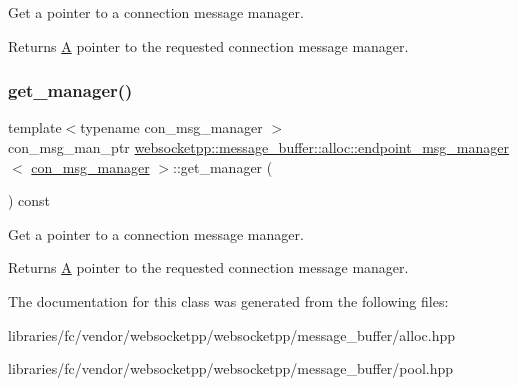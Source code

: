 Get a pointer to a connection message manager. 

\begin{DoxyReturn}{Returns}
\mbox{\hyperlink{struct_a}{A}} pointer to the requested connection message manager. 
\end{DoxyReturn}
\mbox{\label{classwebsocketpp_1_1message__buffer_1_1alloc_1_1endpoint__msg__manager_a58c3cece7c5122cfabb4f0071cd9ced4}} 
\subsubsection{\texorpdfstring{get\+\_\+manager()}{get\_manager()}\hspace{0.1cm}{\footnotesize\ttfamily [2/2]}}
{\footnotesize\ttfamily template$<$typename con\+\_\+msg\+\_\+manager $>$ \\
con\+\_\+msg\+\_\+man\+\_\+ptr \mbox{\hyperlink{classwebsocketpp_1_1message__buffer_1_1alloc_1_1endpoint__msg__manager}{websocketpp\+::message\+\_\+buffer\+::alloc\+::endpoint\+\_\+msg\+\_\+manager}}$<$ \mbox{\hyperlink{classwebsocketpp_1_1message__buffer_1_1alloc_1_1con__msg__manager}{con\+\_\+msg\+\_\+manager}} $>$\+::get\+\_\+manager (\begin{DoxyParamCaption}{ }\end{DoxyParamCaption}) const\hspace{0.3cm}{\ttfamily [inline]}}



Get a pointer to a connection message manager. 

\begin{DoxyReturn}{Returns}
\mbox{\hyperlink{struct_a}{A}} pointer to the requested connection message manager. 
\end{DoxyReturn}


The documentation for this class was generated from the following files\+:\begin{DoxyCompactItemize}
\item 
libraries/fc/vendor/websocketpp/websocketpp/message\+\_\+buffer/alloc.\+hpp\item 
libraries/fc/vendor/websocketpp/websocketpp/message\+\_\+buffer/pool.\+hpp\end{DoxyCompactItemize}
